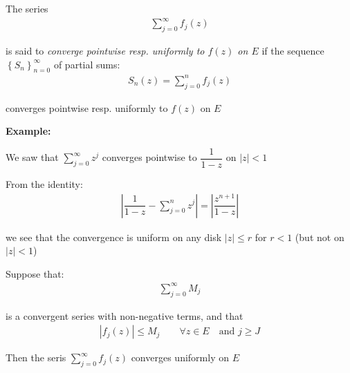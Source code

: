 \begin{theo}{}
  The series
  \begin{equation*}
    \begin{gathered}
      \sum_{j=0}^{\infty}f_j(z)
    \end{gathered}
  \end{equation*}\par
  \noindent is said to \textit{converge pointwise resp. uniformly to $f(z)$ on $E$} if the sequence $\left\{S_n\right\}_{n=0}^{\infty}$ of partial sums:
  \begin{equation*}
    \begin{gathered}
      S_n(z) = \sum_{j=0}^{n}f_j(z)
    \end{gathered}
  \end{equation*}\par
  \noindent converges pointwise resp. uniformly to $f(z)$ on $E$
\end{theo}
\par\bigskip
\noindent\textbf{Example:}\par
\noindent We saw that $\sum_{j=0}^{\infty}z^j$ converges pointwise to $\dfrac{1}{1-z}$ on $\left|z\right|<1$\par
\noindent From the identity:
\begin{equation*}
  \begin{gathered}
    \left|\dfrac{1}{1-z}-\sum_{j=0}^{n}z^j\right| = \left|\dfrac{z^{n+1}}{1-z}\right|
  \end{gathered}
\end{equation*}\par
\noindent we see that the convergence is uniform on any disk $\left|z\right|\leq r$ for $r<1$ (but not on $\left|z\right|<1$)
\newpage
\begin{theo}{}
  Suppose that:
  \begin{equation*}
    \begin{gathered}
      \sum_{j=0}^{\infty}M_j
    \end{gathered}
  \end{equation*}\par
  \noindent is a convergent series with non-negative terms, and that
  \begin{equation*}
    \begin{gathered}
      \left|f_j(z)\right|\leq M_j\qquad\forall z\in E\quad\text{and } j\geq J
    \end{gathered}
  \end{equation*}\par
  \noindent Then the seris $\sum_{j=0}^{\infty}f_j(z)$  converges uniformly on $E$
\end{theo}
